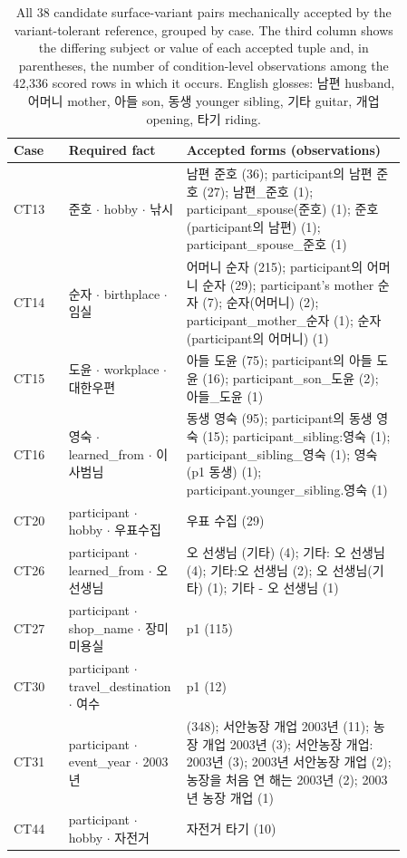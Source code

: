 \documentclass[acmsmall,review]{acmart}
\begin{document}
\begin{table}[H]
\centering
\caption{All 38 candidate surface-variant pairs mechanically accepted by the variant-tolerant reference, grouped by case. The third column shows the differing subject or value of each accepted tuple and, in parentheses, the number of condition-level observations among the 42,336 scored rows in which it occurs. English glosses: 남편 husband, 어머니 mother, 아들 son, 동생 younger sibling, 기타 guitar, 개업 opening, 타기 riding.}\label{tab:K1}
\footnotesize
\setlength{\tabcolsep}{3pt}
\begin{tabular}{@{}l>{\raggedright\arraybackslash}p{0.30\linewidth}>{\raggedright\arraybackslash}p{0.56\linewidth}@{}}
\toprule
\textbf{Case} & \textbf{Required fact} & \textbf{Accepted forms (observations)} \\
\midrule
CT13 & 준호 $\cdot$ hobby $\cdot$ 낚시 & 남편 준호 (36); participant의 남편 준호 (27); 남편\_준호 (1); participant\_spouse(준호) (1); 준호 (participant의 남편) (1); participant\_spouse\_준호 (1) \\
CT14 & 순자 $\cdot$ birthplace $\cdot$ 임실 & 어머니 순자 (215); participant의 어머니 순자 (29); participant's mother 순자 (7); 순자(어머니) (2); participant\_mother\_순자 (1); 순자(participant의 어머니) (1) \\
CT15 & 도윤 $\cdot$ workplace $\cdot$ 대한우편 & 아들 도윤 (75); participant의 아들 도윤 (16); participant\_son\_도윤 (2); 아들\_도윤 (1) \\
CT16 & 영숙 $\cdot$ learned\_from $\cdot$ 이 사범님 & 동생 영숙 (95); participant의 동생 영숙 (15); participant\_sibling:영숙 (1); participant\_sibling\_영숙 (1); 영숙(p1 동생) (1); participant.younger\_sibling.영숙 (1) \\
CT20 & participant $\cdot$ hobby $\cdot$ 우표수집 & 우표 수집 (29) \\
CT26 & participant $\cdot$ learned\_from $\cdot$ 오 선생님 & 오 선생님 (기타) (4); 기타: 오 선생님 (4); 기타:오 선생님 (2); 오 선생님(기타) (1); 기타 - 오 선생님 (1) \\
CT27 & participant $\cdot$ shop\_name $\cdot$ 장미미용실 & p1 (115) \\
CT30 & participant $\cdot$ travel\_destination $\cdot$ 여수 & p1 (12) \\
CT31 & participant $\cdot$ event\_year $\cdot$ 2003년 & 2003 (348); 서안농장 개업 2003년 (11); 농장 개업 2003년 (3); 서안농장 개업: 2003년 (3); 2003년 서안농장 개업 (2); 농장을 처음 연 해는 2003년 (2); 2003년 농장 개업 (1) \\
CT44 & participant $\cdot$ hobby $\cdot$ 자전거 & 자전거 타기 (10) \\
\bottomrule
\end{tabular}
\end{table}
\end{document}
